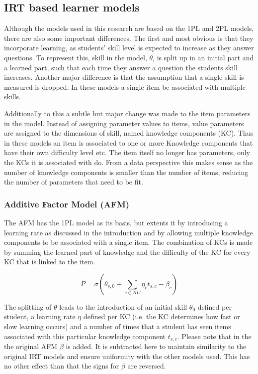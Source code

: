 \documentclass{scrartcl}
\begin{document}
\subsection{IRT based learner models}
Although the models used in this research are based on the 1PL and 2PL models, there are also some important differences. The first and most obvious is that they incorporate learning, as students' skill level is expected to increase as they answer questions. To represent this, skill in the model, $\theta$, is split up in an initial part and a learned part, such that each time they answer a question the students skill increases. 
Another major difference is that the assumption that a single skill is measured is dropped. In these models a single item be associated with multiple skills. 

Additionally to this a subtle but major change was made to the item parameters in the model. Instead of assigning parameter values to items, value parameters are assigned to the dimensions of skill, named knowledge components (KC). Thus in these models an item is associated to one or more Knowledge components that have their own difficulty level etc. The item itself no longer has parameters, only the KCs it is associated with do. From a data perspective this makes sense as the number of knowledge components is smaller than the number of items, reducing the number of parameters that need to be fit.

\subsubsection{Additive Factor Model (AFM)}
\label{sec:AFM}


The AFM has the 1PL model as its basis, but extents it by introducing a learning rate as discussed in the introduction and by allowing multiple knowledge components to be associated with a single item. The combination of KCs is made by summing the learned part of knowledge and the difficulty of the KC for every KC that is linked to the item.

\begin{equation}
\label{eq:afm}
P = \sigma(\theta_{s,0} + \sum_{c \in KC}  \eta_{c} t_{s,c} - \beta_{c})
\end{equation}

The splitting of $\theta$ leads to the introduction of an initial skill $\theta_{0}$ defined per student, a learning rate $\eta$ defined per KC (i.e. the KC determines how fast or slow learning occurs) and a number of times that a student has seen items associated with this particular knowledge component $t_{s,c}$. Please note that in the the original AFM $\beta$ is added. It is subtracted here to maintain similarity to the original IRT models and ensure uniformity with the other models used. This has no other effect than that the signs for $\beta$ are reversed.
\end{document}
